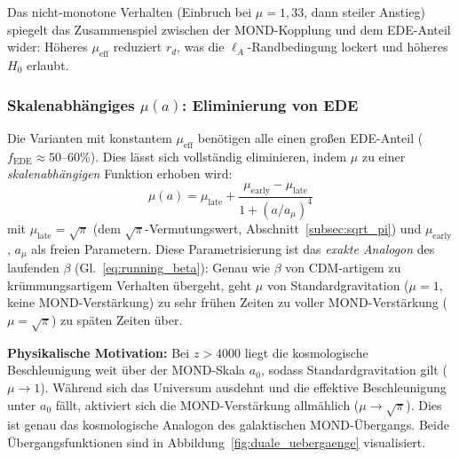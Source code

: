 \documentclass[aps,prd,twocolumn,superscriptaddress,nofootinbib,floatfix]{revtex4-2}
\begin{document}
Das nicht-monotone Verhalten (Einbruch bei $\mu = 1{,}33$, dann steiler Anstieg) spiegelt das Zusammenspiel zwischen der MOND-Kopplung und dem EDE-Anteil wider: Höheres $\mu_{\mathrm{eff}}$ reduziert $r_d$, was die $\ell_A$-Randbedingung lockert und höheres $H_0$ erlaubt.

\subsubsection{Skalenabhängiges \texorpdfstring{$\mu(a)$}{mu(a)}: Eliminierung von EDE}
\label{subsubsec:mu_scale}

Die Varianten mit konstantem $\mu_{\mathrm{eff}}$ benötigen alle einen großen EDE-Anteil ($f_{\mathrm{EDE}} \approx 50$--$60\%$). Dies lässt sich vollständig eliminieren, indem $\mu$ zu einer \textit{skalenabhängigen} Funktion erhoben wird:
\begin{equation}
\mu(a) = \mu_{\mathrm{late}} + \frac{\mu_{\mathrm{early}} - \mu_{\mathrm{late}}}{1 + (a/a_\mu)^4}
\label{eq:mu_running}
\end{equation}
mit $\mu_{\mathrm{late}} = \sqrt{\pi}$ (dem $\sqrt{\pi}$-Vermutungswert, Abschnitt~\ref{subsec:sqrt_pi}) und $\mu_{\mathrm{early}}$, $a_\mu$ als freien Parametern. Diese Parametrisierung ist das \textit{exakte Analogon} des laufenden $\beta$ (Gl.~\ref{eq:running_beta}): Genau wie $\beta$ von CDM-artigem zu krümmungsartigem Verhalten übergeht, geht $\mu$ von Standardgravitation ($\mu = 1$, keine MOND-Verstärkung) zu sehr frühen Zeiten zu voller MOND-Verstärkung ($\mu = \sqrt{\pi}$) zu späten Zeiten über.

\textbf{Physikalische Motivation:} Bei $z > 4000$ liegt die kosmologische Beschleunigung weit über der MOND-Skala $a_0$, sodass Standardgravitation gilt ($\mu \to 1$). Während sich das Universum ausdehnt und die effektive Beschleunigung unter $a_0$ fällt, aktiviert sich die MOND-Verstärkung allmählich ($\mu \to \sqrt{\pi}$). Dies ist genau das kosmologische Analogon des galaktischen MOND-Übergangs. Beide Übergangsfunktionen sind in Abbildung~\ref{fig:duale_uebergaenge} visualisiert.
\end{document}
